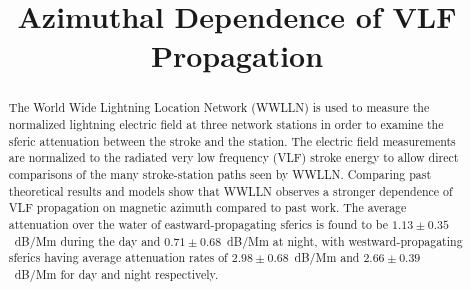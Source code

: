 \documentclass[draft,jgrga]{AGUTeX}
\begin{document}
\title{Azimuthal Dependence of VLF Propagation}



\begin{abstract}

The World Wide Lightning Location Network (WWLLN) is used to measure the normalized lightning electric field at three network stations in order to examine the sferic attenuation between the stroke and the station.
The electric field measurements are normalized to the radiated very low frequency (VLF) stroke energy to allow direct comparisons of the many stroke-station paths seen by WWLLN.
Comparing past theoretical results and models show that WWLLN observes a stronger dependence of VLF propagation on magnetic azimuth compared to past work.
The average attenuation over the water of eastward-propagating sferics is found to be $1.13\pm0.35$~dB/Mm during the day and $0.71\pm0.68$~dB/Mm at night, with westward-propagating sferics having average attenuation rates of $2.98\pm0.68$~dB/Mm and $2.66\pm0.39$~dB/Mm for day and night respectively.

\end{abstract}
\end{document}
